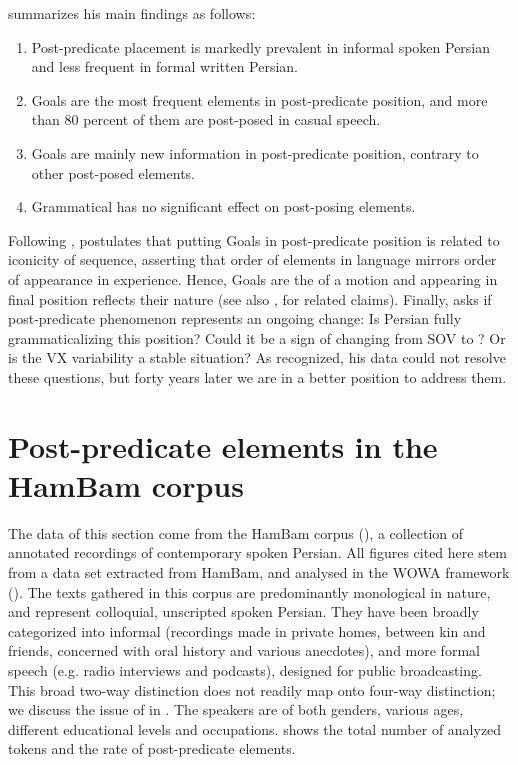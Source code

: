 \documentclass[output=paper,colorlinks,citecolor=brown,draftmode]{langscibook}
\begin{document}
\citet[179--181]{frommer_post-verbal_1981} summarizes his main findings as follows: 
\begin{enumerate}[label=(\alph*)]
 \item {P}ost-predicate placement is markedly prevalent in informal spoken Persian and less frequent in formal written Persian. 
 \item Goals are the most frequent elements in post-predicate position, and more than 80 percent of them are post-posed in casual speech. 
 \item Goals are mainly new information in post-predicate position, contrary to other post-posed elements. 
 \item Grammatical  has no significant effect on post-posing elements. 
\end{enumerate}

Following \citet[532]{Haiman1980iconicity}, \citet[182]{frommer_post-verbal_1981} postulates that putting Goals in post-predicate position is related to iconicity of sequence, asserting that order of elements in language mirrors order of appearance in experience. Hence, Goals are the  of a motion and appearing in final position reflects their nature (see also \citealt{Haig2022PostPredicateCon},  for related claims). Finally, \citet[183]{frommer_post-verbal_1981} asks if post-predicate phenomenon represents an ongoing change: Is Persian fully grammaticalizing this position? Could it be a sign of changing from SOV to ? Or is the VX variability a stable situation? As \citet{frommer_post-verbal_1981} recognized, his data could not resolve these questions, but forty years later we are in a better position to address them. 

\section{Post-predicate elements in the HamBam corpus}\label{Persian:3}

The data of this section come from the HamBam corpus (\citealt{HaigRasekhMahand2022HamBam}), a collection of annotated recordings of contemporary spoken Persian. All figures cited here stem from a data set extracted from HamBam, and analysed in the WOWA framework (\citealt{Izadi2022Persian}). The texts gathered in this corpus are predominantly monological in nature, and represent colloquial, unscripted spoken Persian. They have been broadly categorized into informal (recordings made in private homes, between kin and friends, concerned with oral history and various anecdotes), and more formal speech (e.g. radio interviews and podcasts), designed for public broadcasting. This broad two-way distinction does not readily map onto  four-way distinction; we discuss the issue of  in . The speakers are of both genders, various ages, different educational levels and occupations.  shows the total number of analyzed tokens and the rate of post-predicate elements.
\end{document}
